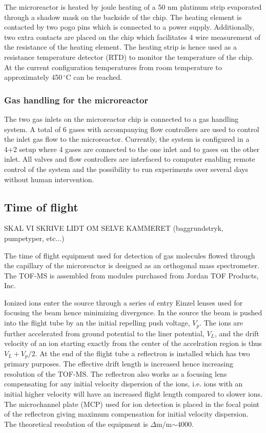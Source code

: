 \documentclass[aip,rsi]{revtex4-1}
\begin{document}
The microreactor is heated by joule heating of a 50 nm platinum strip evaporated through a shadow mask on the backside of the chip. The heating element is contacted by two pogo pins which is connected to a power supply. Additionally, two extra contacts are placed on the chip which facilitates 4 wire measurement of the resistance of the heating element. The heating strip is hence used as a resistance temperature detector (RTD) to monitor the temperature of the chip. At the current configuration temperatures from room temperature to approximately 450\,$^{\circ}$C can be reached.


\subsubsection{Gas handling for the microreactor}
The two gas inlets on the microreactor chip is connected to a gas handling system. A total of 6 gases with accompanying flow controllers are used to control the inlet gas flow to the microreactor. Currently, the system is configured in a 4+2 setup where 4 gases are connected to the one inlet and to gases on the other inlet. All valves and flow controllers are interfaced to computer enabling remote control of the system and the possibility to run experiments over several days without human intervention.

\subsection{Time of flight}
SKAL VI SKRIVE LIDT OM SELVE KAMMERET (baggrundstryk, pumpetyper, etc...)

The time of flight equipment used for detection of gas molecules flowed through the capillary of the microreactor is designed as an orthogonal mass spectrometer. The TOF-MS is assembled from modules purchased from Jordan TOF Products, Inc. 

Ionized ions enter the source through a series of entry Einzel lenses used for focusing the beam hence minimizing divergence. In the source the beam is pushed into the flight tube by an the initial repelling push voltage, $V_p$. The ions are further accelerated from ground potential to the liner potential, $V_L$, and the drift velocity of an ion starting exactly from the center of the accelration region is thus $V_L + V_p/2$. At the end of the flight tube a reflectron is installed which has two primary purposes. The effective drift length is increased hence increasing resolution of the TOF-MS. The reflectron also works as a focusing lens compensating for any initial velocity dispersion of the ions, i.e. ions with an initial higher velocity will have an increased flight length compared to slower ions. The microchannel plate (MCP) used for ion detection is placed in the focal point of the reflectron giving maximum compensation for initial velocity dispersion. The theoretical resolution of the equipment is $\Delta$m/m$\sim$4000.
\end{document}
